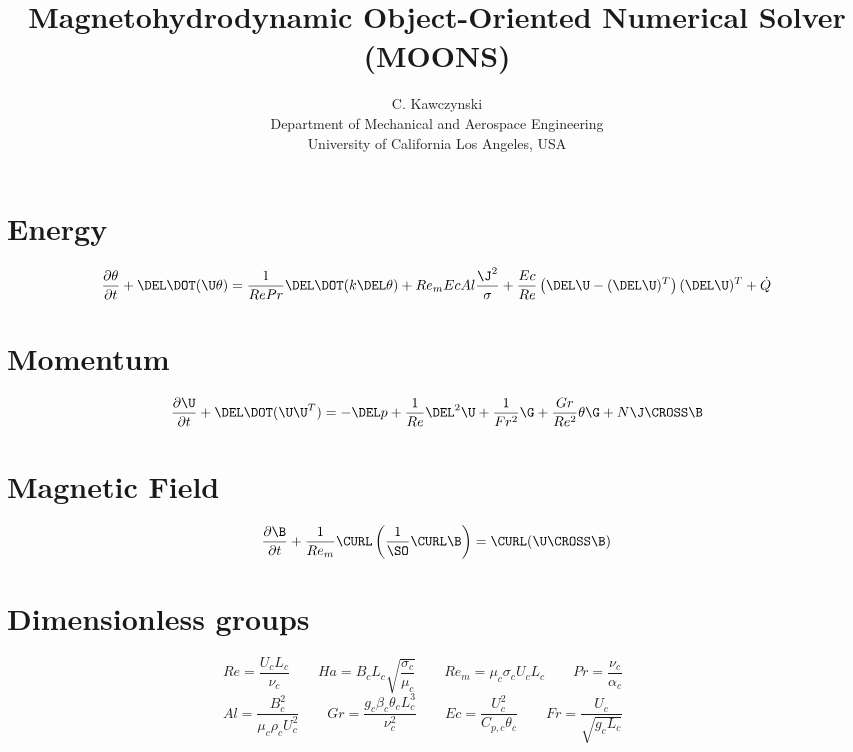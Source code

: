 \documentclass[11pt]{article}
\begin{document}
\doublespacing
\title{Magnetohydrodynamic Object-Oriented Numerical Solver (MOONS)}
\author{C. Kawczynski \\
Department of Mechanical and Aerospace Engineering \\
University of California Los Angeles, USA\\}


\section{Energy}
\Large
\begin{equation}
	\frac{\partial \theta}{\partial t} +
	\DEL \DOT (\U \theta)
	=
	\frac{1}{Re Pr}
	\DEL \DOT (k \DEL \theta) +
	Re_m Ec Al
	\frac{{\J}^2}{\sigma} +
	\frac{Ec}{Re}
	\left(
	\DEL \U
	-
	(\DEL \U)^T
	\right)
	(\DEL \U)^T +
	\dot{Q}
\end{equation}
\section{Momentum}
\begin{equation}
	\frac{\partial \U}{\partial t} +
	\DEL \DOT (\U \U^T)
	=
	- \DEL p
	+ \frac{1}{Re}
	\DEL^2 \U
	+ \frac{1}{Fr^2}
	\G
	+ \frac{Gr}{Re^2}
	\theta \G
	+ N
	\J \CROSS \B
\end{equation}
\section{Magnetic Field}
\begin{equation}
	\frac{\partial \B}{\partial t}
	+ \frac{1}{Re_m} \CURL \left(\frac{1}{\SO} \CURL \B \right)
	= \CURL (\U \CROSS \B)
\end{equation}

\section{Dimensionless groups}
\begin{equation}
	Re = \frac{U_c L_c}{\nu_c} \qquad
	Ha = B_c L_c \sqrt{\frac{\sigma_c}{\mu_c}} \qquad
	Re_m = \mu_c \sigma_c U_c L_c \qquad
	Pr = \frac{\nu_c}{\alpha_c} \qquad
\end{equation}
\begin{equation}
	Al = \frac{B_c^2}{\mu_c \rho_c U_c^2} \qquad
	Gr = \frac{g_c \beta_c \theta_c L_c^3}{\nu_c^2} \qquad
	Ec = \frac{U_c^2}{C_{p,c} \theta_c} \qquad
	Fr = \frac{U_c}{\sqrt{g_c L_c}} \qquad
\end{equation}
\end{document}
